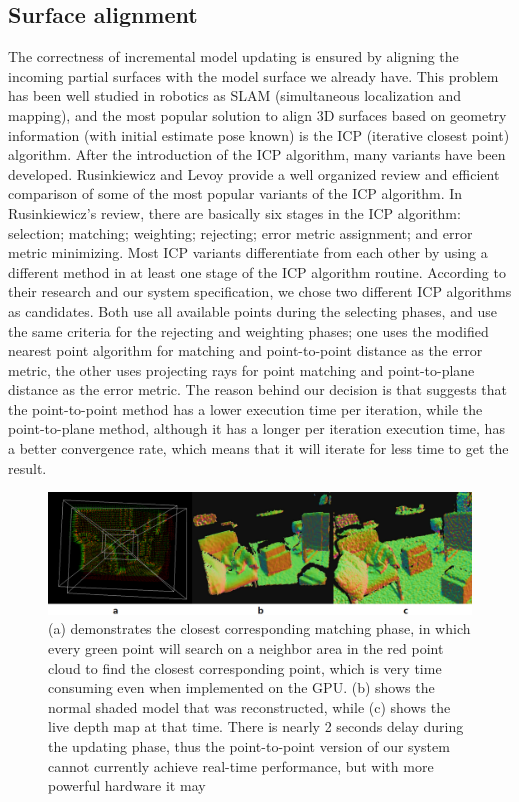 \documentclass[12pt]{article}
\begin{document}
\subsection{Surface alignment}
The correctness of incremental model updating is ensured by aligning the incoming partial surfaces with the model surface we already have. This problem has been well studied in robotics as SLAM (simultaneous localization and mapping), and the most popular solution to align 3D surfaces based on geometry information (with initial estimate pose known) is the ICP (iterative closest point) algorithm. After the introduction of the ICP algorithm, many variants have been developed. Rusinkiewicz and Levoy \cite{Rusinkiewicz} provide a well organized review and efficient comparison of some of the most popular variants of the ICP algorithm. In Rusinkiewicz's review, there are basically six stages in the ICP algorithm: selection; matching; weighting; rejecting; error metric assignment; and error metric minimizing. Most ICP variants differentiate from each other by using a different method in at least one stage of the ICP algorithm routine. According to their research and our system specification, we chose two different ICP algorithms as candidates. Both use all available points during the selecting phases, and use the same criteria for the rejecting and weighting phases; one uses the modified nearest point algorithm for matching and point-to-point distance as the error metric, the other uses projecting rays for point matching and point-to-plane distance as the error metric. The reason behind our decision is that \cite{Rusinkiewicz} suggests that the point-to-point method has a lower execution time per iteration, while the point-to-plane method, although it has a longer per iteration execution time, has a better convergence rate, which means that it will iterate for less time to get the result. 

\begin{figure}[h!]
\includegraphics[width=\textwidth]{point_to_point_matching.png}
\caption{\label{fig:point_to_point}(a) demonstrates the closest corresponding matching phase, in which every green point will search on a neighbor area in the red point cloud to find the closest corresponding point, which is very time consuming even when implemented on the GPU. (b) shows the normal shaded model that was reconstructed, while (c) shows the live depth map at that time. There is nearly 2 seconds delay during the updating phase, thus the point-to-point version of our system cannot currently achieve real-time performance, but with more powerful hardware it may}
\end{figure}
\end{document}
